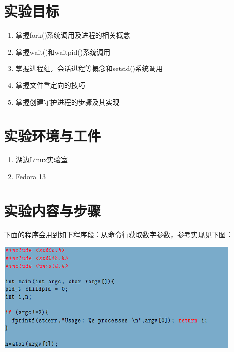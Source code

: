 \documentclass{article}
\begin{document}
\section{实验目标}

\begin{enumerate}
\item 掌握fork()系统调用及进程的相关概念
\item 掌握wait()和waitpid()系统调用
\item 掌握进程组，会话进程等概念和setsid()系统调用
\item 掌握文件重定向的技巧
\item 掌握创建守护进程的步骤及其实现
\end{enumerate}

\section{实验环境与工件}

\begin{enumerate}
\item 湖边Linux实验室  
\item Fedora 13
\end{enumerate}

\section{实验内容与步骤}

下面的程序会用到如下程序段：从命令行获取数字参数，参考实现见下图：
\begin{center}
\includegraphics[width=0.75\columnwidth]{picture1} %
\end{center}
\end{document}
